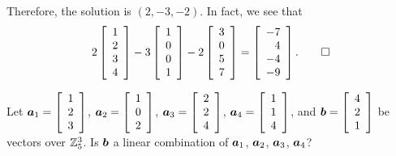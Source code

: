 \begin{Exam}
\[\] Therefore, the solution is $(2,-3,-2)$. In fact, we see that 
\[2\vr{1\\2\\3\\4} - 3 \vr{1\\0\\0\\1} - 2\vr{3\\0\\5\\7} = \vr{-7 \\ 4 \\ -4 \\ -9}. \qedhere\]
\end{Exam}\vs

\begin{Exam} Let $\bb a_1 = \vr{1\\2\\3}$, $\bb a_2 =\vr{1\\0\\2}$, $\bb a_3 =\vr{2\\2\\4}$, $\bb a_4 = \vr{1\\1\\4}$, and $\bb b = \vr{4\\2\\1}$ be vectors over $\Z_5^3$. Is $\bb b$ a linear combination of $\bb a_1$, $\bb a_2$, $\bb a_3$, $\bb a_4$?\\


\end{Exam}

